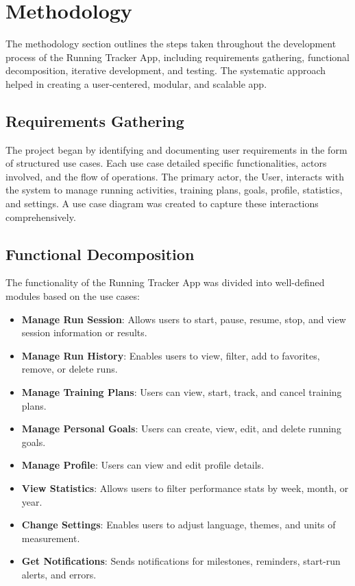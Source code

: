 \section{\bfseries Methodology}
\Large
The methodology section outlines the steps taken throughout the development process of the Running Tracker App, including requirements gathering, functional decomposition, iterative development, and testing. The systematic approach helped in creating a user-centered, modular, and scalable app.

\subsection{Requirements Gathering}
The project began by identifying and documenting user requirements in the form of structured use cases. Each use case detailed specific functionalities, actors involved, and the flow of operations. The primary actor, the User, interacts with the system to manage running activities, training plans, goals, profile, statistics, and settings. A use case diagram was created to capture these interactions comprehensively.

\subsection{Functional Decomposition}
The functionality of the Running Tracker App was divided into well-defined modules based on the use cases:

\begin{itemize}
    \item \textbf{Manage Run Session}: Allows users to start, pause, resume, stop, and view session information or results.
    \item \textbf{Manage Run History}: Enables users to view, filter, add to favorites, remove, or delete runs.
    \item \textbf{Manage Training Plans}: Users can view, start, track, and cancel training plans.
    \item \textbf{Manage Personal Goals}: Users can create, view, edit, and delete running goals.
    \item \textbf{Manage Profile}: Users can view and edit profile details.
    \item \textbf{View Statistics}: Allows users to filter performance stats by week, month, or year.
    \item \textbf{Change Settings}: Enables users to adjust language, themes, and units of measurement.
    \item \textbf{Get Notifications}: Sends notifications for milestones, reminders, start-run alerts, and errors.
\end{itemize}


